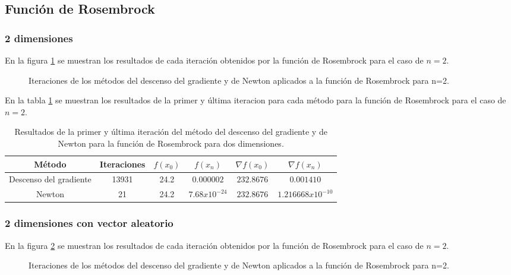 
\subsection{Función de Rosembrock}

\subsubsection{2 dimensiones}

En la figura \ref{fig:rosembrock_2} se muestran los resultados de cada iteración obtenidos por la función de Rosembrock para el caso de $n=2$.

\begin{figure}[H]
    \centering
    \caption{Iteraciones de los métodos del descenso del gradiente y de Newton aplicados a la función de Rosembrock para n=2.}
    \label{fig:rosembrock_2}
\end{figure}

En la tabla \ref{table:rosembrock_2} se muestran los resultados de la primer y última iteracion para cada método para la función de Rosembrock para el caso de $n=2$.

\begin{table}[H]
    \centering
    \begin{tabular}{cccccc} \hline
        Método                 & Iteraciones & $f(x_0)$ & $f(x_n)$        & $\nabla f(x_0)$ & $\nabla f(x_n) $    \\ \hline
        Descenso del gradiente & 13931       & 24.2     & $0.000002$      & $232.8676$      & $0.001410$          \\
        Newton                 & 21          & 24.2     & $7.68x10^{-24}$ & $232.8676$      & $1.216668x10^{-10}$ \\ \hline
    \end{tabular}
    \caption{Resultados de la primer y última iteración del método del descenso del gradiente y de Newton para la función de Rosembrock para dos dimensiones.}
    \label{table:rosembrock_2}
\end{table}

\subsubsection{2 dimensiones con vector aleatorio}

En la figura \ref{fig:rosembrock_2_random} se muestran los resultados de cada iteración obtenidos por la función de Rosembrock para el caso de $n=2$.

\begin{figure}[H]
    \centering
    \caption{Iteraciones de los métodos del descenso del gradiente y de Newton aplicados a la función de Rosembrock para n=2.}
    \label{fig:rosembrock_2_random}
\end{figure}

